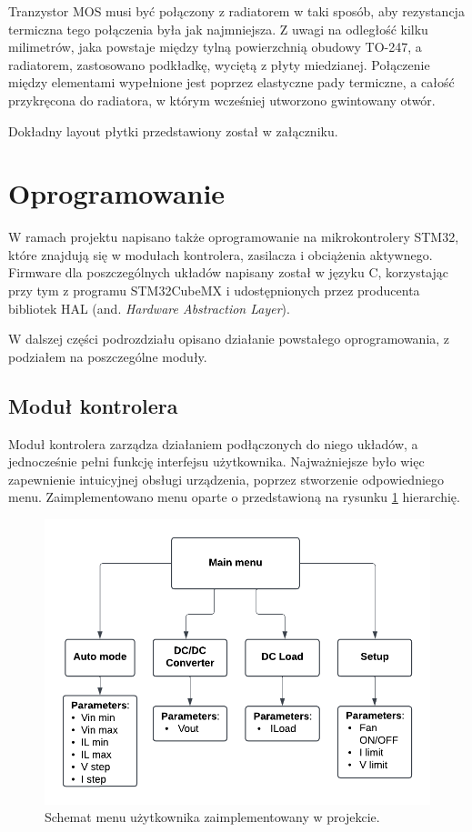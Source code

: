 Tranzystor MOS musi być połączony z radiatorem w taki sposób, aby rezystancja termiczna tego połączenia 
była jak najmniejsza. Z uwagi na odległość kilku milimetrów, jaka powstaje między tylną powierzchnią
obudowy TO-247, a radiatorem, zastosowano podkładkę, wyciętą z płyty miedzianej. Połączenie między elementami
wypełnione jest poprzez elastyczne pady termiczne, a całość przykręcona do radiatora, w którym wcześniej
utworzono gwintowany otwór.

Dokładny layout płytki przedstawiony został w załączniku.



\FloatBarrier
\section{Oprogramowanie}

W ramach projektu napisano także oprogramowanie na mikrokontrolery STM32, które znajdują się 
w modułach kontrolera, zasilacza i obciążenia aktywnego. Firmware dla poszczególnych układów 
napisany został w języku C, korzystając przy tym z programu STM32CubeMX i udostępnionych przez producenta
bibliotek HAL (and. \textit{Hardware Abstraction Layer}).

W dalszej części podrozdziału opisano działanie powstałego oprogramowania, z podziałem na poszczególne moduły.

\subsection{Moduł kontrolera}
 
Moduł kontrolera zarządza działaniem podłączonych do niego układów, a jednocześnie pełni funkcję 
interfejsu użytkownika. Najważniejsze było więc zapewnienie intuicyjnej obsługi urządzenia, poprzez
stworzenie odpowiedniego menu. Zaimplementowano menu oparte o przedstawioną na rysunku \ref{fig:main_menu} hierarchię.

\begin{figure}[h!]
    \begin{center}
        \includegraphics[width = 17cm]{images/menu_diagram.png}
        \caption{Schemat menu użytkownika zaimplementowany w projekcie.} 
        \label{fig:main_menu}
    \end{center}
\end{figure}


